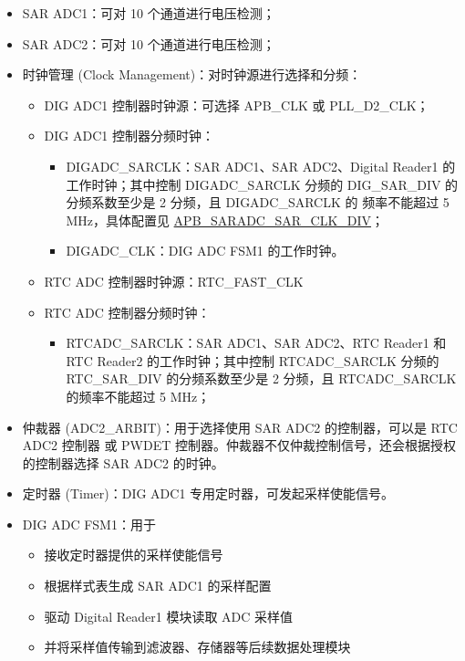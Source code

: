 \documentclass[main\_\_CN.tex]{subfiles}
\begin{document}
\begin{itemize}
    \item SAR ADC1：可对 10 个通道进行电压检测；
    \item SAR ADC2：可对 10 个通道进行电压检测；
    \item 时钟管理 (Clock Management)：对时钟源进行选择和分频：
            \begin{itemize}
                \item DIG ADC1 控制器时钟源：可选择 APB\_CLK 或 PLL\_D2\_CLK；
                \item DIG ADC1 控制器分频时钟：
                \begin{itemize}
                    \item DIGADC\_SARCLK：SAR ADC1、SAR ADC2、Digital Reader1 的工作时钟；其中控制 DIGADC\_SARCLK 分频的 DIG\_SAR\_DIV 的分频系数至少是 2 分频，且 DIGADC\_SARCLK 的 频率不能超过 5 MHz，具体配置见 \hyperref[fielddesc:APBSARADCSARCLKDIV]{APB\_SARADC\_SAR\_CLK\_DIV}；
                    \item DIGADC\_CLK：DIG ADC FSM1 的工作时钟。
                \end{itemize}
                \item RTC ADC 控制器时钟源：RTC\_FAST\_CLK
                \item RTC ADC 控制器分频时钟：
                \begin{itemize}
                    \item RTCADC\_SARCLK：SAR ADC1、SAR ADC2、RTC Reader1 和 RTC Reader2 的工作时钟；其中控制 RTCADC\_SARCLK 分频的 RTC\_SAR\_DIV 的分频系数至少是 2 分频，且 RTCADC\_SARCLK 的频率不能超过 5 MHz；
                \end{itemize}
            \end{itemize}
    \item 仲裁器 (ADC2\_ARBIT)：用于选择使用 SAR ADC2 的控制器，可以是 RTC ADC2 控制器 或 PWDET 控制器。仲裁器不仅仲裁控制信号，还会根据授权的控制器选择 SAR ADC2 的时钟。
    \item 定时器 (Timer)：DIG ADC1 专用定时器，可发起采样使能信号。
    \item DIG ADC FSM1：用于
    \begin{itemize}
        \item 接收定时器提供的采样使能信号
        \item 根据样式表生成 SAR ADC1 的采样配置
        \item 驱动 Digital Reader1 模块读取 ADC 采样值
        \item 并将采样值传输到滤波器、存储器等后续数据处理模块

\end{itemize}
\end{itemize}
\end{document}
